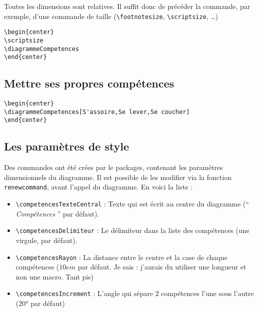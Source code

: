 \documentclass[a4paper,12pt]{article}
\begin{document}
			Toutes les dimensions sont relatives.
			Il suffit donc de précéder la commande, par exemple, d'une commande de taille (\verb!\footnotesize!, \verb!\scriptsize!,  \dots)
			
			\begin{verbatim}
\begin{center}
\scriptsize
\diagrammeCompetences
\end{center}
			\end{verbatim}
		
		\begin{center}
			\scriptsize
			\diagrammeCompetences
		\end{center}
		
		

		\subsection{Mettre ses propres compétences}
	
			
			\begin{verbatim}
\begin{center}
\diagrammeCompetences[S'assoire,Se lever,Se coucher]
\end{center}
			\end{verbatim}
		
			\begin{center}
			\end{center}

		
		\subsection{Les paramètres de style}
		
		
			Des commandes ont été crées par le packages, contenant les paramètres dimensionnels du diagramme.
			Il est possible de les modifier via la fonction \verb!renewcommand!, avant l'appel du diagramme.
			En voici la liste :
			
			\begin{itemize}
				\item \verb!\competencesTexteCentral! : Texte qui est écrit au centre du diagramme (`` \emph{Compétences} '' par défaut).
				\item \verb!\competencesDelimiteur! : Le délimiteur dans la liste des compétences (une virgule, par défaut).
				\item \verb!\competencesRayon! : La distance entre le centre et la case de chaque compétences ($10em$ par défaut. Je sais : j'aurais du utiliser une longueur et non une macro. Tant pis)
				\item \verb!\competencesIncrement! : L'angle qui sépare 2 compétences l'une sous l'autre ($20°$ par défaut)
			\end{itemize}
\end{document}

